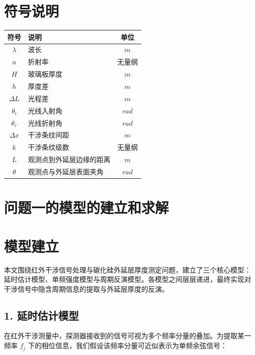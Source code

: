 \documentclass[withoutpreface,bwprint]{cumcmthesis}
\begin{document}

\section{符号说明}
\begin{table}[H]
\centering
\begin{tabularx}{\textwidth}{CLC}
\toprule
符号 & 说明 & 单位 \\
\midrule
$\lambda$ & 波长 & $m$ \\
$n$ & 折射率 & 无量纲 \\
$H$ & 玻璃板厚度 & $m$ \\
$h$ & 厚度差 & $m$ \\
$\Delta L$ & 光程差 & $m$ \\
$\theta_i$ & 光线入射角 & $rad$ \\
$\theta_r$ & 光线折射角 & $rad$ \\
$\Delta x$ & 干涉条纹间距 & $m$ \\
$k$ & 干涉条纹级数 & 无量纲 \\
$L$ & 观测点到外延层边缘的距离 & $m$ \\
$\theta$ & 观测点与外延层表面夹角 & $rad$ \\
\bottomrule
\end{tabularx}
\label{tab:符号说明}
\end{table}



\section{问题一的模型的建立和求解}
\section*{模型建立}
本文围绕红外干涉信号处理与碳化硅外延层厚度测定问题，建立了三个核心模型：延时估计模型、单频强度模型与周期反演模型。各模型之间层层递进，最终实现对干涉信号中隐含周期信息的提取与外延层厚度的反演。

\subsection*{1. 延时估计模型}

在红外干涉测量中，探测器接收到的信号可视为多个频率分量的叠加。为提取某一频率 $f_j$ 下的相位信息，我们假设该频率分量可近似表示为单频余弦信号：
\end{document}
